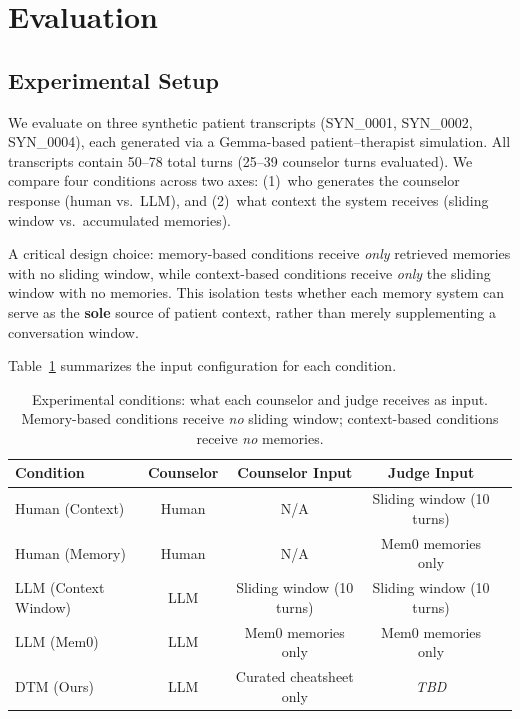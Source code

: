 \documentclass{article} %
\begin{document}


\section{Evaluation}

\subsection{Experimental Setup}

We evaluate on three synthetic patient transcripts (SYN\_0001, SYN\_0002, SYN\_0004), each generated via a Gemma-based patient--therapist simulation. All transcripts contain 50--78 total turns (25--39 counselor turns evaluated). We compare four conditions across two axes: (1)~who generates the counselor response (human vs.\ LLM), and (2)~what context the system receives (sliding window vs.\ accumulated memories).

A critical design choice: memory-based conditions receive \emph{only} retrieved memories with no sliding window, while context-based conditions receive \emph{only} the sliding window with no memories. This isolation tests whether each memory system can serve as the \textbf{sole} source of patient context, rather than merely supplementing a conversation window.

Table~\ref{tab:config} summarizes the input configuration for each condition.

\begin{table}[h]
\centering
\caption{Experimental conditions: what each counselor and judge receives as input. Memory-based conditions receive \emph{no} sliding window; context-based conditions receive \emph{no} memories.}
\label{tab:config}
\small
\begin{tabular}{lcccc}
\toprule
\textbf{Condition} & \textbf{Counselor} & \textbf{Counselor Input} & \textbf{Judge Input} \\
\midrule
Human (Context) & Human & N/A & Sliding window (10 turns) \\
Human (Memory) & Human & N/A & Mem0 memories only \\
LLM (Context Window) & LLM & Sliding window (10 turns) & Sliding window (10 turns) \\
LLM (Mem0) & LLM & Mem0 memories only & Mem0 memories only \\
DTM (Ours) & LLM & Curated cheatsheet only & \textit{TBD} \\
\bottomrule
\end{tabular}
\end{table}
\end{document}

